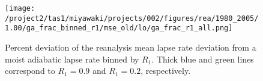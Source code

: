 \documentclass{ametsocV5}
\begin{document}




%

%

\begin{figure}
  \noindent\texttt{[image: /project2/tas1/miyawaki/projects/002/figures/rea/1980\_2005/1.00/ga\_frac\_binned\_r1/mse\_old/lo/ga\_frac\_r1\_all.png]}\\
  \caption{Percent deviation of the reanalysis mean lapse rate deviation from a moist adiabatic lapse rate binned by $R_{1}$. Thick blue and green lines correspond to $R_1=0.9$ and $R_1=0.2$, respectively.}
  \label{fig:rea-binned-r1}
\end{figure}
\end{document}
